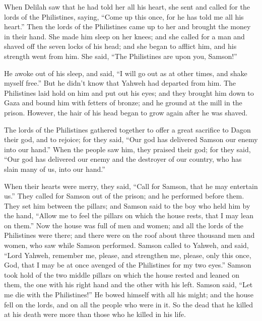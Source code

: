  When Delilah saw that he had told her all his heart, she
sent and called for the lords of the Philistines, saying, ``Come up this
once, for he has told me all his heart.'' Then the lords of the
Philistines came up to her and brought the money in their hand.
 She made him sleep on her knees; and she called for a man
and shaved off the seven locks of his head; and she began to afflict
him, and his strength went from him.  She said, ``The
Philistines are upon you, Samson!''

He awoke out of his sleep, and said, ``I will go out as at other times,
and shake myself free.'' But he didn't know that Yahweh had departed
from him.  The Philistines laid hold on him and put out his
eyes; and they brought him down to Gaza and bound him with fetters of
bronze; and he ground at the mill in the prison.  However,
the hair of his head began to grow again after he was shaved.

 The lords of the Philistines gathered together to offer a
great sacrifice to Dagon their god, and to rejoice; for they said, ``Our
god has delivered Samson our enemy into our hand.''  When
the people saw him, they praised their god; for they said, ``Our god has
delivered our enemy and the destroyer of our country, who has slain many
of us, into our hand.''

 When their hearts were merry, they said, ``Call for
Samson, that he may entertain us.'' They called for Samson out of the
prison; and he performed before them. They set him between the pillars;
 and Samson said to the boy who held him by the hand,
``Allow me to feel the pillars on which the house rests, that I may lean
on them.''  Now the house was full of men and women; and
all the lords of the Philistines were there; and there were on the roof
about three thousand men and women, who saw while Samson performed.
 Samson called to Yahweh, and said, ``Lord Yahweh, remember
me, please, and strengthen me, please, only this once, God, that I may
be at once avenged of the Philistines for my two eyes.'' 
Samson took hold of the two middle pillars on which the house rested and
leaned on them, the one with his right hand and the other with his left.
 Samson said, ``Let me die with the Philistines!'' He bowed
himself with all his might; and the house fell on the lords, and on all
the people who were in it. So the dead that he killed at his death were
more than those who he killed in his life.

